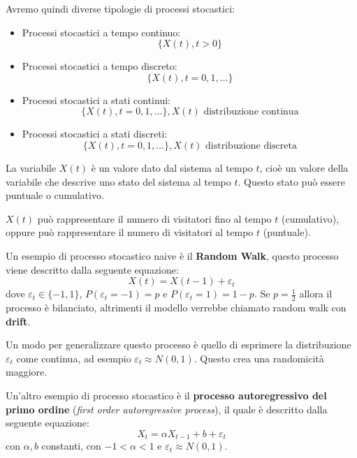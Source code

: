 Avremo quindi diverse tipologie di processi stocastici:
\begin{itemize}
    \item Processi stocastici a tempo continuo:
          \begin{equation*}
              \{X(t), t>0\}
          \end{equation*}
    \item Processi stocastici a tempo discreto:
          \begin{equation*}
              \{X(t), t=0,1,\dots\}
          \end{equation*}
    \item Processi stocastici a stati continui:
          \begin{equation*}
              \{X(t), t=0,1,\dots\}, X(t) \text{ distribuzione continua}
          \end{equation*}
    \item Processi stocastici a stati discreti:
          \begin{equation*}
              \{X(t), t=0,1,\dots\}, X(t) \text{ distribuzione discreta}
          \end{equation*}
\end{itemize}
La variabile $X(t)$ è un valore dato dal sistema al tempo $t$, cioè un valore
della variabile che descrive uno stato del sistema al tempo $t$. Questo stato
può essere puntuale o cumulativo.
\begin{esempio}
    $X(t)$ può rappresentare il numero di visitatori fino al tempo $t$ (cumulativo),
    oppure può rappresentare il numero di visitatori al tempo $t$ (puntuale).
\end{esempio}
Un esempio di processo stocastico naive è il \textbf{Random Walk}, questo processo
viene descritto dalla seguente equazione:
\begin{equation*}
    X(t) = X(t-1) + \varepsilon_t
\end{equation*}
dove $\varepsilon_t \in \{-1, 1\}$,  $P(\varepsilon_t = -1) = p$ e $P(\varepsilon_t = 1) = 1- p$.
Se $p=\frac{1}{2}$ allora il processo è bilanciato, altrimenti il modello verrebbe
chiamato random walk con \textbf{drift}.

Un modo per generalizzare questo processo è quello di esprimere la distribuzione
$\varepsilon_t$ come continua, ad esempio $\varepsilon_t \approx N(0, 1)$. Questo
crea una randomicità maggiore.

Un'altro esempio di processo stocastico è il \textbf{processo autoregressivo del
    primo ordine} (\textit{first order autoregressive process}), il quale è descritto
dalla seguente equazione:
\begin{equation*}
    X_t = \alpha X_{t-1} + b + \varepsilon_t
\end{equation*}
con $\alpha,b$ constanti, con $-1<\alpha<1$ e $\varepsilon_t \approx N(0,1)$.

